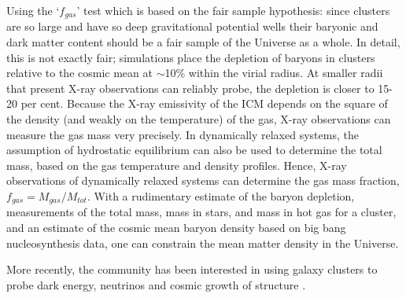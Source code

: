 Using the `$f_{gas}$' test which is based on the fair sample hypothesis: since clusters are so large and have so deep gravitational potential wells their baryonic and dark matter content should be a fair sample of the Universe as a whole. In detail, this is not exactly fair; simulations place the depletion of baryons in clusters relative to the cosmic mean at $\sim$10\% within the virial radius.  At smaller radii that present X-ray observations can reliably probe, the depletion is closer to 15- 20 per cent. 
 Because the X-ray emissivity of the ICM depends on the square of the density (and weakly on the temperature) of the gas, X-ray observations can measure the gas mass very precisely. In dynamically relaxed systems, the assumption of hydrostatic equilibrium can also be used to determine the total mass, based on the gas temperature and density profiles. Hence, X-ray observations of dynamically relaxed systems can determine the gas mass fraction, $f_{gas} = M_{gas}/ M_{tot}$. With a rudimentary estimate of the baryon depletion, measurements of the total mass, mass in stars, and mass in hot gas for a cluster, and an estimate of the cosmic mean baryon density based on big bang nucleosynthesis data, one can constrain the mean matter density in the Universe. 

More recently, the community has been interested in using galaxy clusters to probe dark energy, neutrinos and cosmic growth of structure \citep{allen11,mantz08,mantz10a,mantz15,dehaan16,hasselfield13,plancksz15,bocquet18,rozo10,vikhlinin09,salvati17,zubeldia19}.


